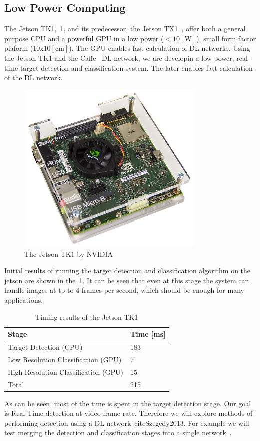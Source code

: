 \documentclass{article} %
\begin{document}
\subsection{Low Power Computing}

The Jetson TK1,~\cref{fig:jetson}, and its predecessor, the Jetson TX1~\cite{jetsontk}, offer
both a general purpose CPU and a powerful GPU in a low power
($<10[\textrm{W}]$), small form factor plaform ($10\textrm{x}10[\textrm{cm}]$).
The GPU enables fast calculation of DL networks. Using the Jetson TK1 and the
Caffe~\cite{jia2014caffe} DL network, we are developin a low power, real-time
target detection and classification system. The later enables fast calculation
of the DL network.
\begin{figure}[h]
	\centering
	\includegraphics[width=0.8\textwidth]{jetson}
	\caption{The Jetson TK1 by NVIDIA}
	\label{fig:jetson}
\end{figure}

Initial results of running the target detection and classification algorithm on
the jetson are shown in the~\cref{tb:jetson1}. It can be seen that even at this
stage the system can handle images at tp to 4 frames per second, which should be
enough for many applications.
\begin{table}
	\centering
	\begin{tabular}{ | l | l | }
		\hline
		Stage 										& Time [ms] 	\\ \hline
		Target Detection (CPU) 						& 183      		\\ \hline
		Low Resolution Classification (GPU) 		& 7 			\\ \hline
		High Resolution Classification (GPU)		& 15 			\\ \hline
		Total 						 				& 215 			\\ \hline
	\end{tabular}
	\caption{Timing results of the Jetson TK1}
	\label{tb:jetson1}
\end{table}
As can be seen, most of the time is spent in the target detection stage.
Our goal is Real Time detection at video frame rate. Therefore we will
explore methods of performing detection using a DL network~cite{Szegedy2013}. For
example we will test merging the detection and classification stages into a
single network~\cite{long2014fully}.
\end{document}

